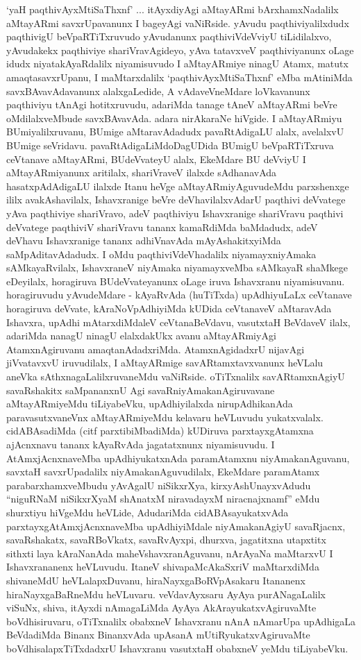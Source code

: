 \begin{artha}
`yaH paqthivAyxMtiSaThxnf' ... itAyxdiyAgi aMtayARmi bArxhamxNadalilx aMtayARmi savxrUpavanunx I bageyAgi vaNiRside. yAvudu paqthiviyalilxdudx paqthivigU beVpaRTiTxruvudo yAvudanunx paqthiviVdeVviyU tiLidilalxvo, yAvudakekx paqthiviye shariVravAgideyo, yAva tatavxveV paqthiviyanunx oLage idudx niyatakAyaRdalilx niyamisuvudo I aMtayARmiye ninagU Atamx, matutx amaqtasavxrUpanu, I maMtarxdalilx `paqthivAyxMtiSaThxnf' eMba mAtiniMda savxBAvavAdavanunx alalxgaLedide, A vAdaveVneMdare loVkavanunx paqthiviyu tAnAgi hotitxruvudu, adariMda tanage tAneV aMtayARmi beVre oMdilalxveMbude savxBAvavAda. adara nirAkaraNe hiVgide. I aMtayARmiyu BUmiyalilxruvanu, BUmige aMtaravAdadudx pavaRtAdigaLU alalx, avelalxvU BUmige seVridavu. pavaRtAdigaLiMdoDagUDida BUmigU beVpaRTiTxruva ceVtanave aMtayARmi, BUdeVvateyU alalx, EkeMdare BU deVviyU I aMtayARmiyanunx aritilalx, shariVraveV ilalxde sAdhanavAda hasatxpAdAdigaLU ilalxde Itanu heVge aMtayARmiyAguvudeMdu parxshenxge ililx avakAshavilalx, Ishavxranige beVre deVhavilalxvAdarU paqthivi deVvatege yAva paqthiviye shariVravo, adeV paqthiviyu Ishavxranige shariVravu paqthivi deVvatege paqthiviV shariVravu tananx kamaRdiMda baMdadudx, adeV deVhavu Ishavxranige tananx adhiVnavAda mAyAshakitxyiMda saMpAditavAdadudx. I oMdu paqthiviVdeVhadalilx niyamayxniyAmaka sAMkayaRvilalx, IshavxraneV niyAmaka niyamayxveMba sAMkayaR shaMkege eDeyilalx, horagiruva BUdeVvateyanunx oLage iruva Ishavxranu niyamisuvanu. horagiruvudu yAvudeMdare - kAyaRvAda (huTiTxda) upAdhiyuLaLx ceVtanave horagiruva deVvate, kAraNoVpAdhiyiMda kUDida  ceVtanaveV aMtaravAda Ishavxra, upAdhi mAtarxdiMdaleV ceVtanaBeVdavu, vasutxtaH BeVdaveV ilalx, adariMda nanagU ninagU elalxdakUkx avanu aMtayARmiyAgi AtamxnAgiruvanu amaqtanAdadxriMda. AtamxnAgidadxrU nijavAgi jiVvatavxvU iruvudilalx, I aMtayARmige savARtamxtavxvanunx heVLalu aneVka sAthxnagaLalilxruvaneMdu vaNiRside. oTiTxnalilx savARtamxnAgiyU savaRshakitx saMpananxnU Agi savaRniyAmakanAgiruvavane aMtayARmiyeMdu tiLiyabeVku, upAdhiyilalxda nirupAdhikanAda paravasutxvaneVnx aMtayARmiyeMdu kelavaru heVLuvudu yukatxvalalx. cidABAsadiMda (citf parxtibiMbadiMda) kUDiruva parxtayxgAtamxna ajAcnxnavu tananx kAyaRvAda jagatatxnunx niyamisuvudu. I AtAmxjAcnxnaveMba upAdhiyukatxnAda paramAtamxnu niyAmakanAguvanu, savxtaH savxrUpadalilx niyAmakanAguvudilalx, EkeMdare paramAtamx parabarxhamxveMbudu yAvAgalU niSikxrXya, kirxyAshUnayxvAdudu ``niguRNaM niSikxrXyaM shAnatxM niravadayxM niracnajxnamf'' eMdu shurxtiyu hiVgeMdu heVLide, AdudariMda cidABAsayukatxvAda parxtayxgAtAmxjAcnxnaveMba upAdhiyiMdale niyAmakanAgiyU savaRjacnx, savaRshakatx, savaRBoVkatx, savaRvAyxpi, dhurxva, jagatitxna utapxtitx sithxti laya kAraNanAda maheVshavxranAguvanu, nArAyaNa maMtarxvU I Ishavxrananenx heVLuvudu. ItaneV shivapaMcAkaSxriV maMtarxdiMda shivaneMdU heVLalapxDuvanu, hiraNayxgaBoRVpAsakaru Itananenx hiraNayxgaBaRneMdu heVLuvaru. veVdavAyxsaru AyAya purANagaLalilx viSuNx, shiva, itAyxdi nAmagaLiMda AyAya AkArayukatxvAgiruvaMte boVdhisiruvaru, oTiTxnalilx obabxneV Ishavxranu nAnA nAmarUpa upAdhigaLa BeVdadiMda Binanx BinanxvAda upAsanA mUtiRyukatxvAgiruvaMte boVdhisalapxTiTxdadxrU Ishavxranu vasutxtaH obabxneV yeMdu tiLiyabeVku.
\end{artha}

